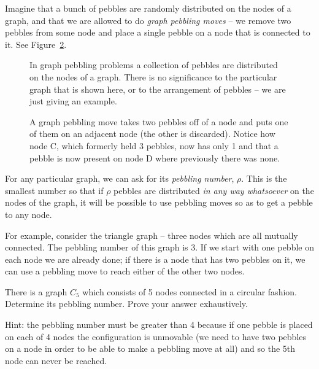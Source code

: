 Imagine that a bunch of pebbles are randomly
distributed on the nodes of a graph, and that we are allowed to do 
\emph{graph pebbling moves} -- we remove two pebbles from some node
and place a single pebble on a node that is connected to it.
See Figure~\ref{fig:pebbling_move}.

\begin{figure}[!hbtp] 
\begin{center}

\end{center}
\caption[Graph pebbling.]{In graph pebbling problems a collection of pebbles
are distributed on the nodes of a graph.  There is no significance to the 
particular graph that is shown here, or to the arrangement of pebbles -- 
we are just giving an example.}
\label{fig:pebbling}
\end{figure}

\begin{figure}[!hbtp] 
\begin{center}

\end{center}
\caption[Graph pebbling move.]{A graph pebbling move takes two pebbles off
of a node and puts one of them on an adjacent node (the other is discarded).
Notice how node C, which formerly held 3 pebbles, now has only 1 and that 
a pebble is now present on node D where previously there was none.}
\label{fig:pebbling_move}
\end{figure}

For any particular graph, we can ask for its \emph{pebbling number}, $\rho$.  
This is the smallest number so that if $\rho$ pebbles are distributed {\em in any way whatsoever} on the nodes of the graph, it will be possible to use 
pebbling moves so as to get a pebble to any node. 

For example, consider the triangle graph -- three nodes which are all 
mutually connected.  The pebbling number of this graph is 3.  If we
start with one pebble on each node we are already done; if there is a 
node that has two pebbles on it, we can use a pebbling move to reach
either of the other two nodes.

\begin{exer} 
There is a graph $C_5$ which consists of 5 nodes connected in a circular
fashion.  Determine its pebbling number.  Prove your answer exhaustively.

Hint: the pebbling number must be greater than 4 because if one pebble is
placed on each of 4 nodes the configuration is unmovable (we need to 
have two pebbles on a node in order to be able to make a pebbling move
at all) and so the 5th node can never be reached.
\end{exer}
 
